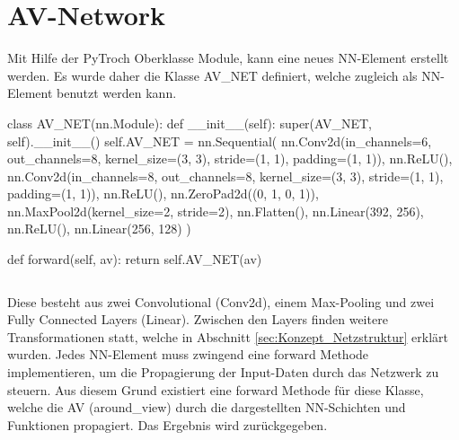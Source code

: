 \section{AV-Network} \label{sec:Anhang_AV_Network}
Mit Hilfe der PyTroch Oberklasse Module, kann eine neues NN-Element erstellt werden.
Es wurde daher die Klasse AV\_NET definiert, welche zugleich als NN-Element benutzt werden kann.
\begin{python}
	class AV_NET(nn.Module):
		def __init__(self):
			super(AV_NET, self).__init__()
			self.AV_NET = nn.Sequential(
			nn.Conv2d(in_channels=6, out_channels=8, kernel_size=(3, 3), stride=(1, 1), padding=(1, 1)),
			nn.ReLU(),
			nn.Conv2d(in_channels=8, out_channels=8, kernel_size=(3, 3), stride=(1, 1), padding=(1, 1)),
			nn.ReLU(),
			nn.ZeroPad2d((0, 1, 0, 1)),
			nn.MaxPool2d(kernel_size=2, stride=2),
			nn.Flatten(),
			nn.Linear(392, 256),
			nn.ReLU(),
			nn.Linear(256, 128)
			)
	
		def forward(self, av):
			return self.AV_NET(av)
\end{python}
\begin{lstlisting}[caption=PyTorch Implementierung des AV-NET]
\end{lstlisting}
Diese besteht aus zwei Convolutional (Conv2d), einem Max-Pooling und zwei Fully Connected Layers (Linear). 
Zwischen den Layers finden weitere Transformationen statt, welche in Abschnitt \ref{sec:Konzept_Netzstruktur} erklärt wurden.
Jedes NN-Element muss zwingend eine forward Methode implementieren, um die Propagierung der Input-Daten durch das Netzwerk zu steuern. Aus diesem Grund existiert eine forward Methode für diese Klasse, welche die AV (around\_view) durch die dargestellten NN-Schichten und Funktionen propagiert. Das Ergebnis wird zurückgegeben.

